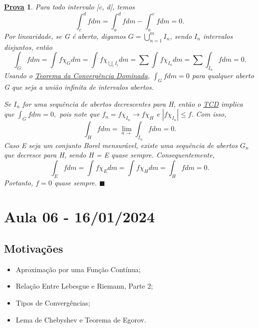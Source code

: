 \documentclass{article}
\newtheorem*{proof*}{\underline{Prova}}
\renewcommand\qedsymbol{$\blacksquare$}
\begin{document}
\begin{proof*}
  Para todo intervalo [c, d], temos 
    \[
      \int_{c}^{d}f dm = \int_{a}^{d} fdm - \int_{a}^{c} fdm = 0.
    \]
  Por linearidade, se G é aberto, digamos \(G = \bigcup_{n=1}^{m}I_{n}\), sendo \(I_{n}\) intervalos disjuntos, então 
    \[
      \int_{G}f dm = \int_{}f \chi_{G} dm = \int_{}f \chi_{\bigcup_{i}^{}I_{i}} dm = \sum\limits_{}^{}\int_{}f \chi_{I_{n}} dm = \sum\limits_{}^{}\int_{I_{n}}f dm = 0.
    \]
  Usando o \hyperlink{dominated_convergence}{\textit{Teorema da Convergência Dominada}}, \(\int_{G}f dm = 0\) para qualquer aberto G que seja a união infinita de intervalos abertos. 

  Se \(I_{n}\) for uma sequência de abertos decrescentes para H, então o \hyperlink{dominated_convergence}{\textit{TCD}} implica que \(\int_{G}f dm = 0,\) pois note que 
  \(f_{n} = f \chi_{I_{n}}\to f \chi_{H}\) e \(|f \chi_{I_{n}}| \leq f.\) Com isso,
    \[
      \int_{H}f dm = \lim_{n\to } \int_{I_{n}}f dm = 0.
    \]
  Caso E seja um conjunto Borel mensurável, existe uma sequência de abertos \(G_{n}\) que decresce para H, sendo H = E quase sempre. Consequentemente, 
    \[
      \int_{E}f dm = \int_{}^{}f \chi_{E} dm = \int_{}f \chi_{H} dm = \int_{H}f dm = 0.
    \]
  Portanto, \(f = 0\) quase sempre. \qedsymbol
\end{proof*}
\newpage

\section{Aula 06 - 16/01/2024}
\subsection{Motivações}
\begin{itemize}
  \item Aproximação por uma Função Contínua; 
  \item Relação Entre Lebesgue e Riemann, Parte 2;
  \item Tipos de Convergências;
  \item Lema de Chebyshev e Teorema de Egorov.
\end{itemize}
\end{document}
